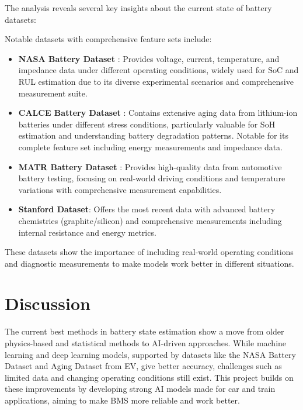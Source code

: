 The analysis reveals several key insights about the current state of battery datasets:

Notable datasets with comprehensive feature sets include:
\begin{itemize}
    \item \textbf{NASA Battery Dataset} \cite{noauthor_nasa_nodate}: Provides voltage, current, temperature, and impedance data under different operating conditions, widely used for SoC and RUL estimation due to its diverse experimental scenarios and comprehensive measurement suite.
    \item \textbf{CALCE Battery Dataset} \cite{CALCE_battery_nodate}: Contains extensive aging data from lithium-ion batteries under different stress conditions, particularly valuable for SoH estimation and understanding battery degradation patterns. Notable for its complete feature set including energy measurements and impedance data.
    \item \textbf{MATR Battery Dataset} \cite{MATR_dataset_nodate}: Provides high-quality data from automotive battery testing, focusing on real-world driving conditions and temperature variations with comprehensive measurement capabilities.
    \item \textbf{Stanford Dataset}: Offers the most recent data with advanced battery chemistries (graphite/silicon) and comprehensive measurements including internal resistance and energy metrics.
\end{itemize}
These datasets show the importance of including real-world operating conditions and diagnostic measurements to make models work better in different situations.


\section{Discussion}
The current best methods in battery state estimation show a move from older physics-based and statistical methods to AI-driven approaches. While machine learning and deep learning models, supported by datasets like the NASA Battery Dataset and Aging Dataset from EV, give better accuracy, challenges such as limited data and changing operating conditions still exist. This project builds on these improvements by developing strong AI models made for car and train applications, aiming to make BMS more reliable and work better.
